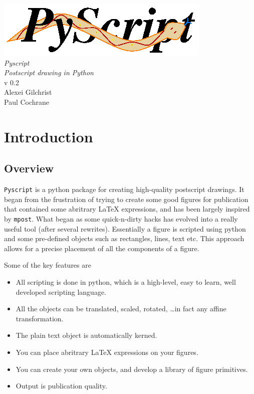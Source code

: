 \documentclass[a4paper]{book}
\begin{document}
\begin{titlepage}
\begin{center}
\vspace*{3cm}
\LARGE

\includegraphics{logo}\\[4cm]

{\Huge \emph{Pyscript}}\\[1cm]
\emph{Postscript drawing in Python}\\[2cm]

v 0.2\\[2cm]

Alexei Gilchrist\\
Paul Cochrane
\end{center}
\end{titlepage}

\frontmatter

\tableofcontents

\mainmatter

\chapter{Introduction}
\label{cha:introduction}


\section{Overview}

\Verb|Pyscript| is a python package for creating high-quality postscript
drawings.  It began from the frustration of trying to create some good figures
for publication that contained some abritrary \LaTeX{} expressions, and has
been largely inspired by \Verb|mpost|. What began as some quick-n-dirty hacks
has evolved into a really useful tool (after several rewrites). Essentially a
figure is scripted using python and some pre-defined objects such as
rectangles, lines, text etc. This approach allows for a precise placement of
all the components of a figure.

Some of the key features are
\begin{itemize}
\item All scripting is done in python, which is a high-level, easy to
  learn, well developed scripting language.
\item All the objects can be translated, scaled, rotated, \ldots in fact any
affine transformation.  
\item The plain text object is automatically kerned.
\item You can place abritrary \LaTeX{} expressions on your figures.
\item You can create your own objects, and develop a library of figure 
primitives. 
\item Output is publication quality.
\end{itemize}
\end{document}
